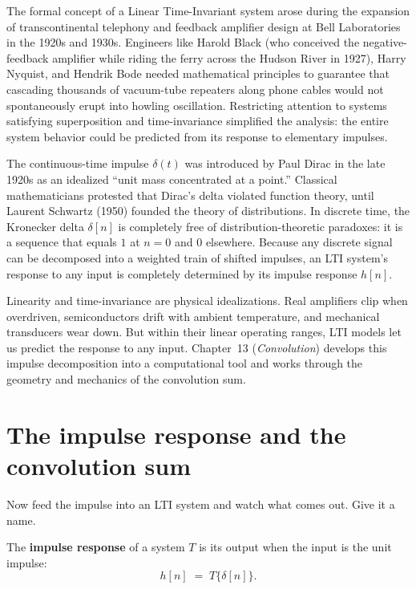 \begin{historybox}
The formal concept of a Linear Time-Invariant system arose during the expansion of transcontinental
telephony and feedback amplifier design at Bell Laboratories in the 1920s and 1930s.
Engineers like Harold Black (who conceived the negative-feedback amplifier while riding the ferry
across the Hudson River in 1927), Harry Nyquist, and Hendrik Bode needed mathematical principles to
guarantee that cascading thousands of vacuum-tube repeaters along phone cables would not spontaneously
erupt into howling oscillation. Restricting attention to systems satisfying superposition and time-invariance
simplified the analysis: the entire system behavior could be predicted from its response to elementary
impulses.

The continuous-time impulse $\delta(t)$ was introduced by Paul Dirac in the late 1920s as an idealized
``unit mass concentrated at a point.'' Classical mathematicians protested that Dirac's delta violated
function theory, until Laurent Schwartz (1950) founded the theory of distributions. In discrete time,
the Kronecker delta $\delta[n]$ is completely free of distribution-theoretic paradoxes: it is
a sequence that equals $1$ at $n=0$ and $0$ elsewhere. Because any discrete signal can be decomposed into
a weighted train of shifted impulses, an LTI system's response to any input is completely determined by
its impulse response $h[n]$.

Linearity and time-invariance are physical idealizations. Real amplifiers clip when overdriven,
semiconductors drift with ambient temperature, and mechanical transducers wear down. But within their
linear operating ranges, LTI models let us predict the response to any input. Chapter~13 (\emph{Convolution})
develops this impulse decomposition into a computational tool and works through the geometry
and mechanics of the convolution sum.
\end{historybox}

\section{The impulse response and the convolution sum}
\label{ch12:impulse-response}

Now feed the impulse into an LTI system and watch what comes out. Give it a
name.

\begin{definition}
\label{ch12:def-h}
The \textbf{impulse response} of a system $T$ is its output when the input is the
unit impulse:
\[
  h[n] \;=\; T\{\delta[n]\}.
\]
\end{definition}

